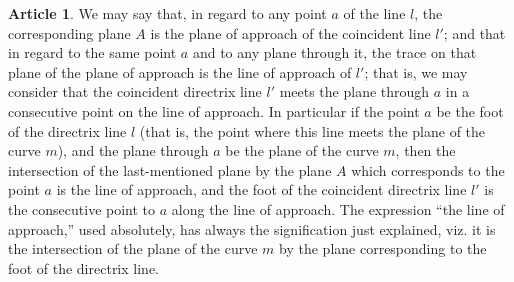 \documentclass[12pt,a4paper]{article}
\theoremstyle{definition}
\newtheorem{art}{Article}[section]
\begin{document}
\begin{art}
We may say that, in regard to any point $a$ of the line $l$, the corresponding plane $A$ is the plane of approach of the coincident line $l'$; and that in regard to the same point $a$ and to any plane through it, the trace on that plane of the plane of approach is the line of approach of $l'$; that is, we may consider that the coincident directrix line $l'$ meets the plane through $a$ in a consecutive point on the line of approach. In particular if the point $a$ be the foot of the directrix line $l$ (that is, the point where this line meets the plane of the curve $m$), and the plane through $a$ be the plane of the curve $m$, then the intersection of the last-mentioned plane by the plane $A$ which corresponds to the point $a$ is the line of approach, and the foot of the coincident directrix line $l'$ is the consecutive point to $a$ along the line of approach. The expression ``the line of approach,'' used absolutely, has always the signification just explained, viz. it is the intersection of the plane of the curve $m$ by the plane corresponding to the foot of the directrix line.
\end{art}
\end{document}
